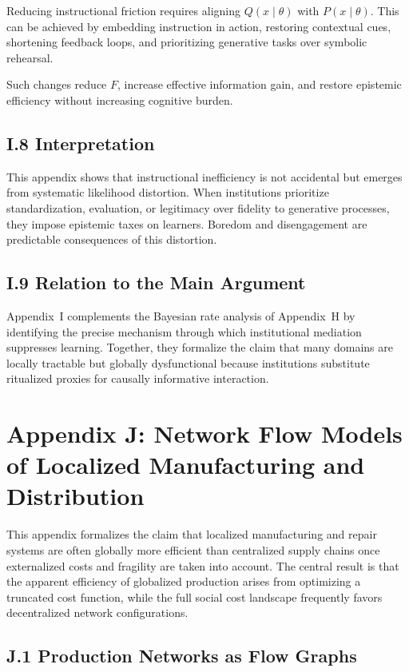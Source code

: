 \documentclass[11pt]{article}
\begin{document}
Reducing instructional friction requires aligning \(Q(x \mid \theta)\) with \(P(x \mid \theta)\). This can be achieved by embedding instruction in action, restoring contextual cues, shortening feedback loops, and prioritizing generative tasks over symbolic rehearsal.

Such changes reduce \(F\), increase effective information gain, and restore epistemic efficiency without increasing cognitive burden.

\subsection{I.8 Interpretation}

This appendix shows that instructional inefficiency is not accidental but emerges from systematic likelihood distortion. When institutions prioritize standardization, evaluation, or legitimacy over fidelity to generative processes, they impose epistemic taxes on learners. Boredom and disengagement are predictable consequences of this distortion.

\subsection{I.9 Relation to the Main Argument}

Appendix~I complements the Bayesian rate analysis of Appendix~H by identifying the precise mechanism through which institutional mediation suppresses learning. Together, they formalize the claim that many domains are locally tractable but globally dysfunctional because institutions substitute ritualized proxies for causally informative interaction.

\section{Appendix J: Network Flow Models of Localized Manufacturing and Distribution}
\label{app:network-detailed}

This appendix formalizes the claim that localized manufacturing and repair systems are often globally more efficient than centralized supply chains once externalized costs and fragility are taken into account. The central result is that the apparent efficiency of globalized production arises from optimizing a truncated cost function, while the full social cost landscape frequently favors decentralized network configurations.

\subsection{J.1 Production Networks as Flow Graphs}
\end{document}

